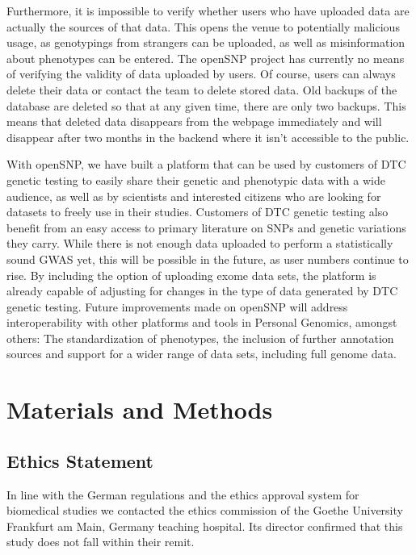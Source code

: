 \documentclass[10pt]{article}
\begin{document}
Furthermore, it is impossible to verify whether users who have uploaded data are actually the sources of that data. This opens the venue to potentially malicious usage, as genotypings from strangers can be uploaded, as well as misinformation about phenotypes can be entered. The openSNP project has currently no means of verifying the validity of data uploaded by users. Of course, users can always delete their data or contact the team to delete stored data. Old backups of the database are deleted so that at any given time, there are only two backups. This means that deleted data disappears from the webpage immediately and will disappear after two months in the backend where it isn't accessible to the public.

With openSNP, we have built a platform that can be used by customers of DTC genetic testing to easily share their genetic and phenotypic 
data with a wide audience, as well as by scientists and interested citizens who are looking for datasets to freely use in their studies.
Customers of DTC genetic testing also benefit from an easy access to primary literature on SNPs and genetic variations they carry. 
While there is not enough data uploaded to perform a statistically sound GWAS yet, this will be possible in the future, as user numbers continue to rise. By including the option of uploading exome data sets, the platform is already capable of adjusting for changes in the type of data generated by DTC genetic testing. Future improvements made on openSNP will address interoperability with other platforms and tools in Personal Genomics, amongst others: The standardization of phenotypes, the inclusion of further annotation sources and support for a wider range of data sets, including full genome data.

 
\section*{Materials and Methods}
\subsection*{Ethics Statement}
In line with the German regulations and the ethics approval system for biomedical studies \cite{Pinkerton2002} we contacted the ethics commission of the Goethe University Frankfurt am Main, Germany teaching hospital. Its director confirmed that this study does not fall within their remit.
\end{document}
